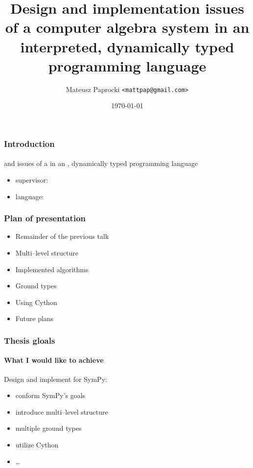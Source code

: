 \documentclass{beamer}
\title{
    Design and implementation issues \linebreak
    of a computer algebra system \linebreak
    in an interpreted, dynamically typed \linebreak
    programming language
}
\author{Mateusz Paprocki \texttt{<mattpap@gmail.com>}}
\institute[PWR]{Wrocław University of Technology}
\date{\today}
\begin{document}
\begin{frame}[plain,t]
    \maketitle
\end{frame}

\begin{frame}
    \frametitle{Introduction}
    \framesubtitle{}

    \begin{center}
         and  issues \linebreak
        of a  \linebreak
        in an , dynamically typed \linebreak
        programming language
    \end{center}

    \begin{itemize}
        \item supervisor: 
        \item language: 
    \end{itemize}
\end{frame}

\begin{frame}
    \frametitle{Plan of presentation}

    \begin{itemize}
        \item Remainder of the previous talk
        \item Multi--level structure
        \item Implemented algorithms
        \item Ground types
        \item Using Cython
        \item Future plans
    \end{itemize}
\end{frame}

\begin{frame}
    \frametitle{Thesis gloals}
    \framesubtitle{What I would like to achieve}

    Design and implement  for SymPy:
    \begin{itemize}
        \item conform SymPy's goals
        \pause
        \item introduce multi--level structure
        \pause
        \item multiple ground types
        \pause
        \item utilize  Cython
        \pause
        \item \ldots
    \end{itemize}
\end{frame}
\end{document}
